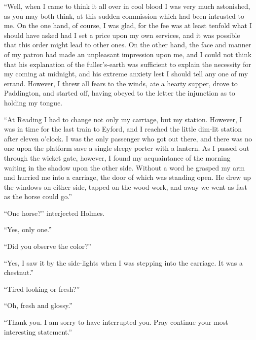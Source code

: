 “Well, when I came to think it all over in cool blood I was
very much astonished, as you may both think, at this sudden
commission which had been intrusted to me. On the one
hand, of course, I was glad, for the fee was at least tenfold
what I should have asked had I set a price upon my own
services, and it was possible that this order might lead to
other ones. On the other hand, the face and manner of my
patron had made an unpleasant impression upon me, and I
could not think that his explanation of the fuller’s-earth was
sufficient to explain the necessity for my coming at midnight,
and his extreme anxiety lest I should tell any one of my errand.
However, I threw all fears to the winds, ate a hearty
supper, drove to Paddington, and started off, having obeyed
to the letter the injunction as to holding my tongue.

“At Reading I had to change not only my carriage, but my
station. However, I was in time for the last train to Eyford,
and I reached the little dim-lit station after eleven o’clock. I
was the only passenger who got out there, and there was no
one upon the platform save a single sleepy porter with a lantern.
As I passed out through the wicket gate, however, I
found my acquaintance of the morning waiting in the shadow
upon the other side. Without a word he grasped my arm and
hurried me into a carriage, the door of which was standing
open. He drew up the windows on either side, tapped on the
wood-work, and away we went as fast as the horse could go.”

“One horse?” interjected Holmes.

“Yes, only one.”

“Did you observe the color?”

“Yes, I saw it by the side-lights when I was stepping into
the carriage. It was a chestnut.”

“Tired-looking or fresh?”

“Oh, fresh and glossy.”

“Thank you. I am sorry to have interrupted you. Pray
continue your most interesting statement.”

